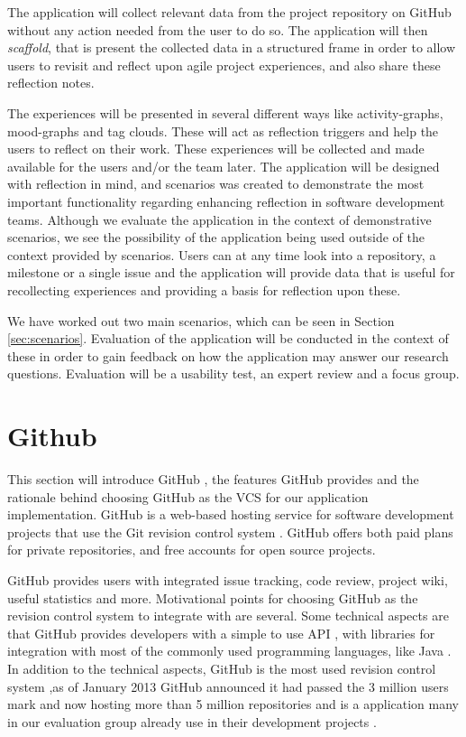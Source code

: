 The application will collect relevant data from the project repository on GitHub without any action needed from the user to do so. The application will then \emph{scaffold}, that is present the collected data in a structured frame in order to allow users to revisit and reflect upon agile project experiences, and also share these reflection notes.

The experiences will be presented in several different ways like activity-graphs, mood-graphs and tag clouds. These will act as reflection triggers and help the users to reflect on their work. These experiences will be collected and made available for the users and/or the team later. The application will be designed with reflection in mind, and scenarios was created to demonstrate the most important functionality regarding enhancing reflection in software development teams. Although we evaluate the application in the context of demonstrative scenarios, we see the possibility of the application being used outside of the context provided by scenarios. Users can at any time look into a repository, a milestone or a single issue and the application will provide data that is useful for recollecting experiences and providing a basis for reflection upon these. 

We have worked out two main scenarios, which can be seen in Section \ref{sec:scenarios}. Evaluation of the application will be conducted in the context of these in order to gain feedback on how the application may answer our research questions. Evaluation will be a usability test, an expert review and a focus group. 

\section{Github}
\label{githubchapter}
This section will introduce GitHub \citep{github}, the features GitHub provides and the rationale behind choosing GitHub as the VCS for our application implementation. 
GitHub is a web-based hosting service for software development projects that use the Git revision control system \citep{git}. GitHub offers both paid plans for private repositories, and free accounts for open source projects.

GitHub provides users with integrated issue tracking, code review, project wiki, useful statistics and more. 
Motivational points for choosing GitHub as the revision control system to integrate with are several. Some technical aspects are that GitHub provides developers with a simple to use API \citep{githubapi}, with libraries for integration with most of the commonly used programming languages, like Java \citep{jgit}.
In addition to the technical aspects, GitHub is the most used revision control system ,as of January 2013 GitHub announced it had passed the 3 million users mark and now hosting more than 5 million repositories and is a application many in our evaluation group already use in their development projects \citep{githubnumbers}.


